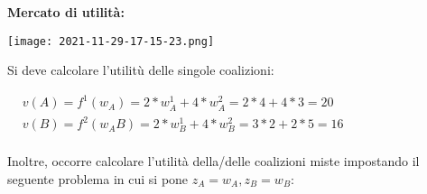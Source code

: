 \documentclass{article}
\theoremstyle{definition}
\theoremstyle{remark}
\begin{document}
\textbf{Mercato di utilità:}
\begin{center}
    \texttt{[image: 2021-11-29-17-15-23.png]}
\end{center}
Si deve calcolare l'utilitù delle singole coalizioni:
\begin{center}
    $\begin{aligned}
        & v(A)=f^1(w_A)=2*w_A^1+4*w_A^2=2*4+4*3=20\\
        & v(B)=f^2(w_AB)=2*w_B^1+4*w_B^2=3*2+2*5=16\\
    \end{aligned}$
\end{center}
Inoltre, occorre calcolare l'utilità della/delle coalizioni miste impostando il seguente problema in cui si pone \(z_A=w_A,z_B=w_B\):
\begin{center}
    $\begin{aligned}
        
    \end{aligned}$
\end{center}
\end{document}
